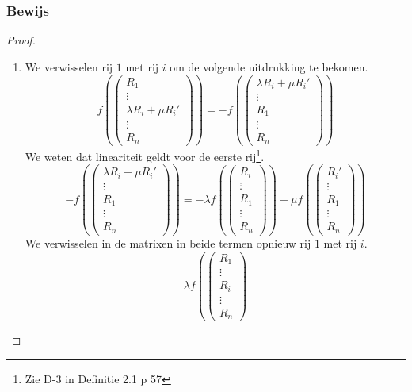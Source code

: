 \documentclass[lineaire_algebra_oplossingen.tex]{subfiles}
\begin{document}
\subsubsection*{Bewijs}
\begin{proof}
\begin{enumerate}
\item We verwisselen rij $1$ met rij $i$ om de volgende uitdrukking te bekomen.
\[
f\left(
\begin{pmatrix}
R_1 \\ \vdots \\ \lambda R_i + \mu R_i' \\ \vdots \\R_n
\end{pmatrix}
\right)
=
-
f\left(
\begin{pmatrix}
\lambda R_i + \mu R_i' \\ \vdots \\ R_1 \\ \vdots \\R_n
\end{pmatrix}
\right)
\] 
We weten dat lineariteit geldt voor de eerste rij\footnote{Zie D-3 in Definitie 2.1 p 57}.
\[
-
f\left(
\begin{pmatrix}
\lambda R_i + \mu R_i' \\ \vdots \\ R_1 \\ \vdots \\R_n
\end{pmatrix}
\right)
=
-
\lambda
f\left(
\begin{pmatrix}
R_i \\ \vdots \\ R_1\\\vdots \\R_n
\end{pmatrix}
\right)
-
\mu 
f
\left(
\begin{pmatrix}
R_i' \\ \vdots \\ R_1 \\\vdots \\R_n
\end{pmatrix}
\right)
\] 
We verwisselen in de matrixen in beide termen opnieuw rij $1$ met rij $i$.
\[
\lambda
f\left(
\begin{pmatrix}
R_1 \\ \vdots \\ R_i\\\vdots \\R_n
\end{pmatrix}
\]
\end{enumerate}
\end{proof}
\end{document}
